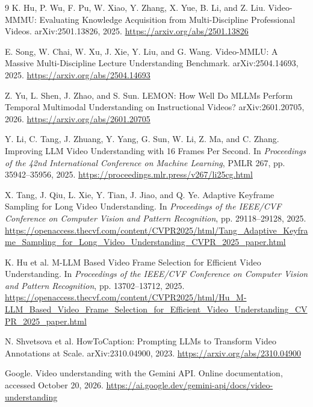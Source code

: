 \documentclass[11pt]{article}
\begin{document}
\begin{thebibliography}{9}
K. Hu, P. Wu, F. Pu, W. Xiao, Y. Zhang, X. Yue, B. Li, and Z. Liu.
\newblock Video-MMMU: Evaluating Knowledge Acquisition from Multi-Discipline Professional Videos.
\newblock arXiv:2501.13826, 2025.
\newblock \url{https://arxiv.org/abs/2501.13826}

E. Song, W. Chai, W. Xu, J. Xie, Y. Liu, and G. Wang.
\newblock Video-MMLU: A Massive Multi-Discipline Lecture Understanding Benchmark.
\newblock arXiv:2504.14693, 2025.
\newblock \url{https://arxiv.org/abs/2504.14693}

Z. Yu, L. Shen, J. Zhao, and S. Sun.
\newblock LEMON: How Well Do MLLMs Perform Temporal Multimodal Understanding on Instructional Videos?
\newblock arXiv:2601.20705, 2026.
\newblock \url{https://arxiv.org/abs/2601.20705}

Y. Li, C. Tang, J. Zhuang, Y. Yang, G. Sun, W. Li, Z. Ma, and C. Zhang.
\newblock Improving LLM Video Understanding with 16 Frames Per Second.
\newblock In \emph{Proceedings of the 42nd International Conference on Machine Learning}, PMLR 267, pp. 35942--35956, 2025.
\newblock \url{https://proceedings.mlr.press/v267/li25cg.html}

X. Tang, J. Qiu, L. Xie, Y. Tian, J. Jiao, and Q. Ye.
\newblock Adaptive Keyframe Sampling for Long Video Understanding.
\newblock In \emph{Proceedings of the IEEE/CVF Conference on Computer Vision and Pattern Recognition}, pp. 29118--29128, 2025.
\newblock \url{https://openaccess.thecvf.com/content/CVPR2025/html/Tang_Adaptive_Keyframe_Sampling_for_Long_Video_Understanding_CVPR_2025_paper.html}

K. Hu et al.
\newblock M-LLM Based Video Frame Selection for Efficient Video Understanding.
\newblock In \emph{Proceedings of the IEEE/CVF Conference on Computer Vision and Pattern Recognition}, pp. 13702--13712, 2025.
\newblock \url{https://openaccess.thecvf.com/content/CVPR2025/html/Hu_M-LLM_Based_Video_Frame_Selection_for_Efficient_Video_Understanding_CVPR_2025_paper.html}

N. Shvetsova et al.
\newblock HowToCaption: Prompting LLMs to Transform Video Annotations at Scale.
\newblock arXiv:2310.04900, 2023.
\newblock \url{https://arxiv.org/abs/2310.04900}

Google.
\newblock Video understanding with the Gemini API.
\newblock Online documentation, accessed October 20, 2026.
\newblock \url{https://ai.google.dev/gemini-api/docs/video-understanding}
\end{thebibliography}
\end{document}
